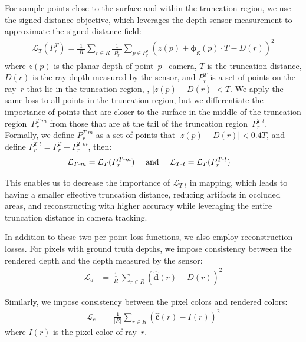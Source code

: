 For sample points close to the surface and within the truncation region, we use the signed distance objective, which leverages the depth sensor measurement to approximate the signed distance field:
\begin{align}
    \mathcal{L}_{T}(P_{r}^{T}) = \frac{1}{|R|} \sum_{r \in R} \frac{1}{|P_{r}^{T}|} \sum_{p \in P_{r}^{T}} \left( z(p) + \boldsymbol{\phi_{g}}(p) \cdot T - D(r) \right)^2
\end{align}
where $z(p)$ is the planar depth of point~$p$ \wrt~camera, $T$ is the truncation distance, $D(r)$ is the ray depth measured by the sensor, and $P_{r}^{T}$ is a set of points on the ray~$r$ that lie in the truncation region, \ie, $|z(p) - D(r)| < T$. We apply the same loss to all points in the truncation region, but we differentiate the importance of points that are closer to the surface in the middle of the truncation region~$P_{r}^{T\text{-}m}$ from those that are at the tail of the truncation region~$P_{r}^{T\text{-}t}$. Formally, we define $P_{r}^{T\text{-}m}$ as a set of points that $|z(p) - D(r)| < 0.4T$, and define $P_{r}^{T\text{-}t} = P_{r}^{T} - P_{r}^{T\text{-}m}$, then:
\begin{align}
	\mathcal{L}_{T\text{-}m} &= \mathcal{L}_{T}(P_{r}^{T\text{-}m}) \text{\phantom{00} and \phantom{00}} \mathcal{L}_{T\text{-}t} = \mathcal{L}_{T}(P_{r}^{T\text{-}t})
\end{align}

This enables us to decrease the importance of $\mathcal{L}_{T\text{-}t}$ in mapping, which leads to having a smaller effective truncation distance, reducing artifacts in occluded areas, and reconstructing with higher accuracy while leveraging the entire truncation distance in camera tracking. 

In addition to these two per-point loss functions, we also employ reconstruction losses. For pixels with ground truth depths, we impose consistency between the rendered depth and the depth measured by the sensor:
\begin{align}
	\mathcal{L}_{d} &= \frac{1}{|R|} \sum_{r \in R} \left( \boldsymbol{\hat{d}}(r) - D(r) \right)^2
\end{align}

Similarly, we impose consistency between the pixel colors and rendered colors:
\begin{align}
	\mathcal{L}_{c} &= \frac{1}{|R|} \sum_{r \in R} \left( \boldsymbol{\hat{c}}(r) - I(r) \right)^2
\end{align}
where $I(r)$ is the pixel color of ray~$r$.

